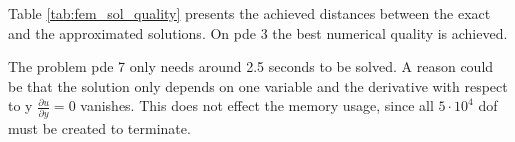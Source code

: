 \documentclass[./\jobname.tex]{subfiles}
\begin{document}
Table \ref{tab:fem_sol_quality} presents the achieved distances between the exact and the approximated solutions. On \gls{pde} 3 the best numerical quality is achieved.

The problem \gls{pde} 7 only needs around 2.5 seconds to be solved. A reason could be that the solution only depends on one variable and the derivative with respect to y $\frac{\partial u}{\partial y} = 0$ vanishes. This does not effect the memory usage, since all $5 \cdot 10^4$ \gls{dof} must be created to terminate. 

\begin{table}[h]
	\centering
	\noindent{}
	\label{tab:fem_sol_quality}
\end{table}
\end{document}
